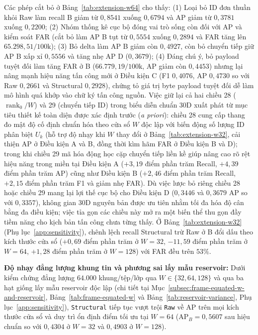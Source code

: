 \documentclass[12pt, a4paper, reqno, oneside]{book}
\DeclareRobustCommand{\code}[1]{\nolinkurl{#1}}
\begin{document}
Các phép cắt bỏ ở Bảng~\ref{tab:extension-w64} cho thấy: (1) Loại bỏ ID đơn thuần khỏi Raw làm recall B giảm từ $0{,}8541$ xuống $0{,}6794$ và AP giảm từ $0{,}3781$ xuống $0{,}2200$; (2) Nhóm thống kê cục bộ đóng vai trò sống còn đối với AP và kiểm soát FAR (cắt bỏ làm AP B tụt từ $0{,}5554$ xuống $0{,}2894$ và FAR tăng lên $65.298{,}51/100\text{k}$); (3) Bỏ delta làm AP B giảm còn $0{,}4927$, còn bỏ chuyển tiếp giữ AP B xấp xỉ $0{,}5556$ và tăng nhẹ AP D ($0{,}3679$); (4) Đáng chú ý, bỏ payload tuyệt đối làm tăng FAR ở B ($66.779{,}19/100\text{k}$, AP giảm còn $0{,}4453$) nhưng lại nâng mạnh hiệu năng tấn công mới ở Điều kiện C (F1 $0{,}4076$, AP $0{,}4730$ so với Raw $0{,}2661$ và Structural $0{,}2928$), chứng tỏ giá trị byte payload tuyệt đối dễ làm mô hình quá khớp vào chữ ký tấn công nguồn. Việc giữ lại cả hai chiều 28 ($\operatorname{rank}_0/W$) và 29 (chuyển tiếp ID) trong biểu diễn chuẩn 30D xuất phát từ mục tiêu thiết kế toàn diện được xác định trước (\textit{a priori}): chiều 28 cung cấp thang đo mật độ cố định chuẩn hóa theo cửa sổ $W$ độc lập với biến động số lượng ID phân biệt $U_k$ (hỗ trợ độ nhạy khi $W$ thay đổi ở Bảng~\ref{tab:extension-w32}, cải thiện AP ở Điều kiện A và B, đồng thời kìm hãm FAR ở Điều kiện B và D); trong khi chiều 29 mã hóa động học cặp chuyển tiếp liền kề giúp nâng cao rõ rệt hiệu năng trong miền tại Điều kiện A ($+3{,}19$ điểm phần trăm Recall, $+4{,}39$ điểm phần trăm AP) cũng như Điều kiện B ($+2{,}46$ điểm phần trăm Recall, $+2{,}15$ điểm phần trăm F1 và giảm nhẹ FAR). Dù việc lược bỏ riêng chiều 28 hoặc chiều 29 mang lại lợi thế cục bộ cho Điều kiện D ($0{,}3446$ và $0{,}3679$ AP so với $0{,}3357$), không gian 30D nguyên bản được ưu tiên nhằm tối đa hóa độ cân bằng đa điều kiện; việc tỉa gọn các chiều này mở ra một biến thể thu gọn đầy tiềm năng cho kịch bản tấn công chưa từng thấy. Ở Bảng~\ref{tab:extension-w32} (Phụ lục~\ref{app:sensitivity}), chênh lệch recall Structural trừ Raw ở B đổi dấu theo kích thước cửa sổ ($+0{,}69$ điểm phần trăm ở $W=32$, $-11{,}59$ điểm phần trăm ở $W=64$, $+1{,}28$ điểm phần trăm ở $W=128$) với FAR đều trên $53\%$.

\noindent\textbf{Độ nhạy đẳng lượng khung tin và phương sai lấy mẫu reservoir:} Dưới kiểm chứng đẳng lượng $64.000$ khung/tệp/lớp qua $W \in \{32, 64, 128\}$ và qua ba hạt giống lấy mẫu reservoir độc lập (chi tiết tại Mục~\ref{subsec:frame-equated-w-and-reservoir}, Bảng~\ref{tab:frame-equated-w} và Bảng~\ref{tab:reservoir-variance}, Phụ lục~\ref{app:sensitivity}), \code{Structural} tiếp tục vượt trội \code{Raw} về AP trên mọi kích thước cửa sổ và duy trì ổn định điểm tối ưu tại $W=64$ ($\text{AP}_B=0{,}5607$ sau hiệu chuẩn so với $0{,}4304$ ở $W=32$ và $0{,}4903$ ở $W=128$).
\end{document}
